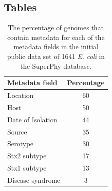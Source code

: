 \documentclass[doublespacing, linenumbers]{bmcart}
\begin{document}
\begin{backmatter}

\newpage
\section*{Tables}
\begin{table}[h!]
\caption{The percentage of genomes that contain metadata for each of the metadata fields in the initial public data set of 1641 \textit{E. coli} in the SuperPhy database.}
\label{tab:metadata}
      \begin{tabular}{lc}
        \hline
        Metadata field & Percentage\\ \hline
        Location & 60\\
        Host & 50\\
        Date of Isolation & 44\\
        Source & 35\\
        Serotype & 30\\
        Stx2 subtype & 17\\
        Stx1 subtype & 13\\
        Disease syndrome & 3\\ 
      \end{tabular}
\end{table}





\end{backmatter}
\end{document}
